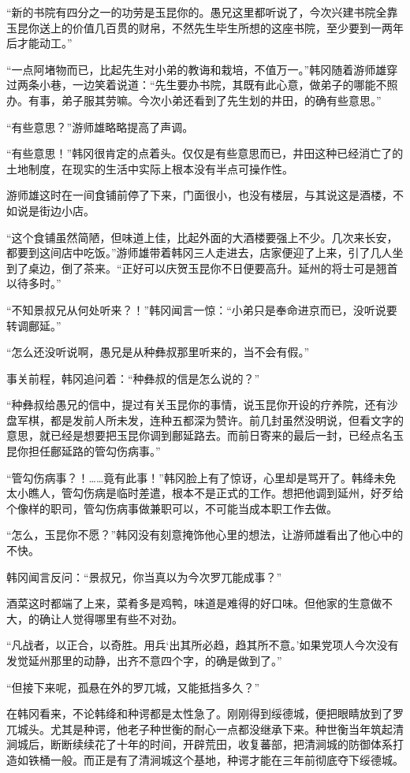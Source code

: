 “新的书院有四分之一的功劳是玉昆你的。愚兄这里都听说了，今次兴建书院全靠玉昆你送上的价值几百贯的财帛，不然先生毕生所想的这座书院，至少要到一两年后才能动工。”

“一点阿堵物而已，比起先生对小弟的教诲和栽培，不值万一。”韩冈随着游师雄穿过两条小巷，一边笑着说道：“先生要办书院，其既有此心意，做弟子的哪能不照办。有事，弟子服其劳嘛。今次小弟还看到了先生划的井田，的确有些意思。”

“有些意思？”游师雄略略提高了声调。

“有些意思！”韩冈很肯定的点着头。仅仅是有些意思而已，井田这种已经消亡了的土地制度，在现实的生活中实际上根本没有半点可操作性。

游师雄这时在一间食铺前停了下来，门面很小，也没有楼层，与其说这是酒楼，不如说是街边小店。

“这个食铺虽然简陋，但味道上佳，比起外面的大酒楼要强上不少。几次来长安，都要到这间店中吃饭。”游师雄带着韩冈三人走进去，店家便迎了上来，引了几人坐到了桌边，倒了茶来。“正好可以庆贺玉昆你不日便要高升。延州的将士可是翘首以待多时。”

“不知景叔兄从何处听来？！”韩冈闻言一惊：“小弟只是奉命进京而已，没听说要转调鄜延。”

“怎么还没听说啊，愚兄是从种彝叔那里听来的，当不会有假。”

事关前程，韩冈追问着：“种彝叔的信是怎么说的？”

“种彝叔给愚兄的信中，提过有关玉昆你的事情，说玉昆你开设的疗养院，还有沙盘军棋，都是发前人所未发，连种五都深为赞许。前几封虽然没明说，但看文字的意思，就已经是想要把玉昆你调到鄜延路去。而前日寄来的最后一封，已经点名玉昆你担任鄜延路的管勾伤病事。”

“管勾伤病事？！……竟有此事！”韩冈脸上有了惊讶，心里却是骂开了。韩绛未免太小瞧人，管勾伤病是临时差遣，根本不是正式的工作。想把他调到延州，好歹给个像样的职司，管勾伤病事做兼职可以，不可能当成本职工作去做。

“怎么，玉昆你不愿？”韩冈没有刻意掩饰他心里的想法，让游师雄看出了他心中的不快。

韩冈闻言反问：“景叔兄，你当真以为今次罗兀能成事？”

酒菜这时都端了上来，菜肴多是鸡鸭，味道是难得的好口味。但他家的生意做不大，的确让人觉得哪里有些不对劲。

“凡战者，以正合，以奇胜。用兵‘出其所必趋，趋其所不意。’如果党项人今次没有发觉延州那里的动静，出齐不意四个字，的确是做到了。”

“但接下来呢，孤悬在外的罗兀城，又能抵挡多久？”

在韩冈看来，不论韩绛和种谔都是太性急了。刚刚得到绥德城，便把眼睛放到了罗兀城头。尤其是种谔，他老子种世衡的耐心一点都没继承下来。种世衡当年筑起清涧城后，断断续续花了十年的时间，开辟荒田，收复蕃部，把清涧城的防御体系打造如铁桶一般。而正是有了清涧城这个基地，种谔才能在三年前彻底夺下绥德城。

